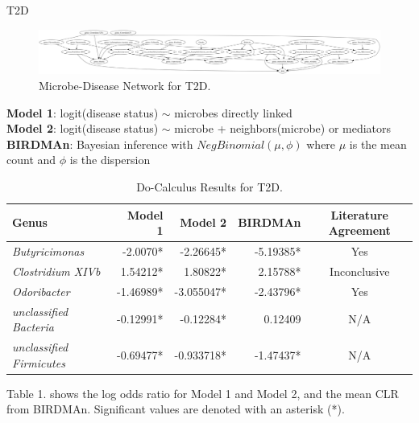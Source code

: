 \documentclass[final]{beamer}
\newlength{\colwidth}
\begin{document}
\begin{frame}[t]
\begin{columns}[t]
\begin{column}{\colwidth}
\begin{block}{T2D}
    \begin{figure}
      \centering
      \includegraphics[width=\linewidth]{../graphs/t2d/cdnod_norm.png}
      \caption{Microbe-Disease Network for T2D.}
    \end{figure}
    
    \textbf{Model 1}: logit(disease status) $\sim$ microbes directly linked \\
    \textbf{Model 2}: logit(disease status) $\sim$ microbe + neighbors(microbe) or mediators \\
    \textbf{BIRDMAn}: Bayesian inference with $NegBinomial(\mu, \phi)$ where $\mu$ is the mean count and $\phi$ is the dispersion
    
    \begin{table}
      \centering
      \begin{tabular}{l r r r c}
        \toprule
        \textbf{Genus} & \textbf{Model 1} & \textbf{Model 2} & \textbf{BIRDMAn} & \textbf{Literature Agreement} \\
        \midrule
        \textit{Butyricimonas} & -2.0070* & -2.26645* & -5.19385* & Yes \\
        \textit{Clostridium XIVb} & 1.54212* & 1.80822* & 2.15788* & Inconclusive \\
        \textit{Odoribacter} & -1.46989* & -3.055047* & -2.43796* & Yes \\
        \textit{unclassified Bacteria} & -0.12991* & -0.12284* & 0.12409 & N/A \\
        \textit{unclassified Firmicutes} & -0.69477* & -0.933718* & -1.47437* & N/A \\
        \bottomrule
      \end{tabular}
      \caption{Do-Calculus Results for T2D.}
    \end{table}
    
    Table 1. shows the log odds ratio for Model 1 and Model 2, and the mean CLR from BIRDMAn. Significant values are denoted with an asterisk (*). \\
    
    

\end{block}
\end{column}
\end{columns}
\end{frame}
\end{document}
